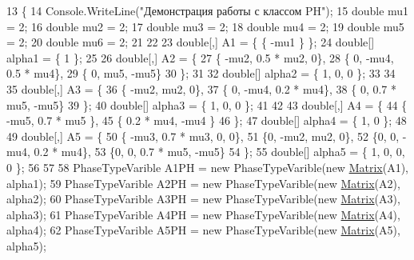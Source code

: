 \begin{DoxyCode}
13         \{
14             Console.WriteLine(\textcolor{stringliteral}{"Демонстрация работы с классом PH"});
15             \textcolor{keywordtype}{double} mu1 = 2;
16             \textcolor{keywordtype}{double} mu2 = 2;
17             \textcolor{keywordtype}{double} mu3 = 2;
18             \textcolor{keywordtype}{double} mu4 = 2;
19             \textcolor{keywordtype}{double} mu5 = 2;
20             \textcolor{keywordtype}{double} mu6 = 2;
21 
22 
23             \textcolor{keywordtype}{double}[,] A1 = \{ \{ -mu1 \} \};
24             \textcolor{keywordtype}{double}[] alpha1 = \{ 1 \};
25 
26             \textcolor{keywordtype}{double}[,] A2 = \{
27                 \{ -mu2, 0.5 * mu2, 0\},
28                 \{ 0, -mu4, 0.5 * mu4\},
29                 \{ 0, mu5, -mu5\}
30             \};
31 
32             \textcolor{keywordtype}{double}[] alpha2 = \{ 1, 0, 0 \};
33 
34 
35             \textcolor{keywordtype}{double}[,] A3 = \{
36                 \{ -mu2, mu2, 0\},
37                 \{ 0, -mu4, 0.2 * mu4\},
38                 \{ 0, 0.7 * mu5, -mu5\}
39             \};
40             \textcolor{keywordtype}{double}[] alpha3 = \{ 1, 0, 0 \};
41 
42 
43             \textcolor{keywordtype}{double}[,] A4 = \{
44                 \{ -mu5, 0.7 * mu5 \},
45                 \{ 0.2 * mu4, -mu4 \}
46             \};
47             \textcolor{keywordtype}{double}[] alpha4 = \{ 1, 0 \};
48 
49             \textcolor{keywordtype}{double}[,] A5 = \{
50                 \{ -mu3, 0.7 * mu3, 0, 0\},
51                 \{0, -mu2, mu2, 0\},
52                 \{0, 0, -mu4, 0.2 * mu4\},
53                 \{0, 0, 0.7 * mu5, -mu5\}
54             \};
55             \textcolor{keywordtype}{double}[] alpha5 = \{ 1, 0, 0, 0 \};
56 
57 
58             PhaseTypeVarible A1PH = \textcolor{keyword}{new} PhaseTypeVarible(\textcolor{keyword}{new} \hyperlink{class_b_l_a_s_1_1_matrix}{Matrix}(A1), alpha1);
59             PhaseTypeVarible A2PH = \textcolor{keyword}{new} PhaseTypeVarible(\textcolor{keyword}{new} \hyperlink{class_b_l_a_s_1_1_matrix}{Matrix}(A2), alpha2);
60             PhaseTypeVarible A3PH = \textcolor{keyword}{new} PhaseTypeVarible(\textcolor{keyword}{new} \hyperlink{class_b_l_a_s_1_1_matrix}{Matrix}(A3), alpha3);
61             PhaseTypeVarible A4PH = \textcolor{keyword}{new} PhaseTypeVarible(\textcolor{keyword}{new} \hyperlink{class_b_l_a_s_1_1_matrix}{Matrix}(A4), alpha4);
62             PhaseTypeVarible A5PH = \textcolor{keyword}{new} PhaseTypeVarible(\textcolor{keyword}{new} \hyperlink{class_b_l_a_s_1_1_matrix}{Matrix}(A5), alpha5);

\end{DoxyCode}
